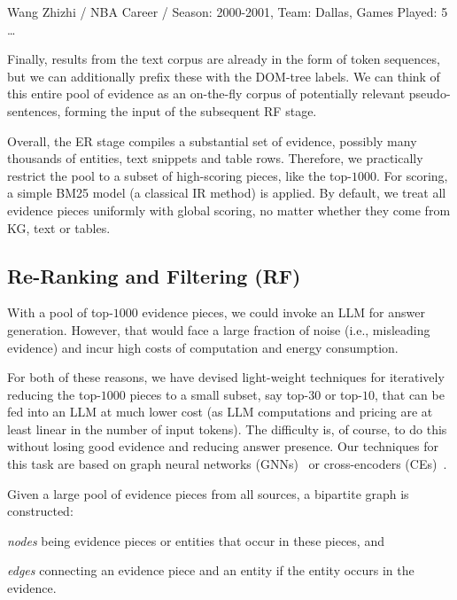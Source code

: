 \vspace{0.05cm}
\hspace*{0.5cm} Wang Zhizhi / NBA Career / Season: 2000-2001, Team: Dallas, Games Played: 5 \dots
\vspace{0.05cm}

\noindent Finally, results from the text corpus are already in the form of token sequences, but we can additionally prefix these with the DOM-tree labels.
We can think of this entire pool of evidence as 
an on-the-fly corpus of potentially relevant pseudo-sentences, forming the input of the subsequent RF stage.


\vspace{0.2cm}
Overall, the ER stage compiles a substantial set of evidence, possibly many thousands of entities, text snippets and table rows. Therefore, we practically restrict the pool to a subset of high-scoring pieces, like the top-$1000$.
For scoring, a simple BM25 model (a classical IR method) is applied. 
By default, we treat all evidence pieces uniformly with global scoring, no matter whether they come from KG, text or tables. 


\subsection{Re-Ranking and Filtering (RF)}

With a pool of top-$1000$ evidence pieces, we could invoke an LLM for answer generation. However, that would face a large fraction of noise (i.e., misleading evidence) and incur high costs of computation and energy consumption. 

For both of these reasons, we have devised light-weight techniques for iteratively reducing the top-$1000$ pieces to a small subset, say top-$30$ or top-$10$, that can be fed into an LLM at much lower cost (as LLM computations and pricing are at least linear in the number of input tokens). The difficulty is, of course, to do this without losing good evidence and reducing answer presence. Our techniques for this task are based on graph neural networks (GNNs)~\cite{Wu:IEEE2021} or cross-encoders (CEs)~\cite{Dejean:arxiv2024,Lin:MC2021}.

Given a large pool of evidence pieces from all sources, a bipartite graph is constructed:
\squishlist
\item {\em nodes} being evidence pieces or entities that occur in these pieces, and
\item {\em edges} connecting an evidence piece and an entity if the entity occurs in the evidence.
\squishend


